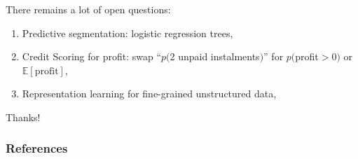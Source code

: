 \documentclass[english,xcolor={rgb,dvipsnames,table,usenames}]{beamer}
\begin{document}
\begin{frame}
\frametitle{\subsecname}

There remains a lot of open questions:
\begin{enumerate}
\item Predictive segmentation: logistic regression trees,

\medskip

\item<3-> Credit Scoring for profit: swap ``$p($2 unpaid instalments$)$'' for $p($profit$>0)$ or $\mathbb{E}[\text{profit}]$,

\medskip

\item<5-> Representation learning for fine-grained unstructured data,

\medskip

\end{enumerate}

\end{frame}



\begin{frame}

\Huge

Thanks!

\end{frame}


\begin{frame}[allowframebreaks]
\frametitle{References}
\begin{scriptsize}
\printbibliography
\end{scriptsize}
\end{frame}
\end{document}

